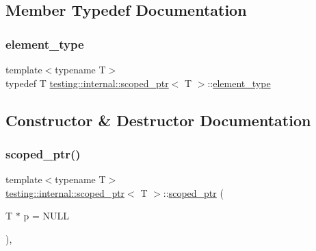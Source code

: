\subsection{Member Typedef Documentation}
\mbox{\label{classtesting_1_1internal_1_1scoped__ptr_ae755ffeebada8e20b68c1d1ffa91cf13}} 
\subsubsection{\texorpdfstring{element\+\_\+type}{element\_type}}
{\footnotesize\ttfamily template$<$typename T$>$ \\
typedef T \hyperlink{classtesting_1_1internal_1_1scoped__ptr}{testing\+::internal\+::scoped\+\_\+ptr}$<$ T $>$\+::\hyperlink{classtesting_1_1internal_1_1scoped__ptr_ae755ffeebada8e20b68c1d1ffa91cf13}{element\+\_\+type}}



\subsection{Constructor \& Destructor Documentation}
\mbox{\label{classtesting_1_1internal_1_1scoped__ptr_adb972432999a0c63720df148964ac2a5}} 
\subsubsection{\texorpdfstring{scoped\+\_\+ptr()}{scoped\_ptr()}}
{\footnotesize\ttfamily template$<$typename T$>$ \\
\hyperlink{classtesting_1_1internal_1_1scoped__ptr}{testing\+::internal\+::scoped\+\_\+ptr}$<$ T $>$\+::\hyperlink{classtesting_1_1internal_1_1scoped__ptr}{scoped\+\_\+ptr} (\begin{DoxyParamCaption}\item[{T $\ast$}]{p = {\ttfamily NULL} }\end{DoxyParamCaption})\hspace{0.3cm}{\ttfamily [inline]}, {\ttfamily [explicit]}}

